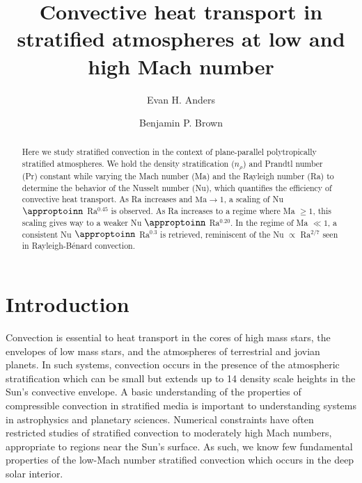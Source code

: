 \documentclass[aps, prl, twocolumn, groupedaddress, amsfonts, amssymb, amsmath]{revtex4-1}
\newcommand{\RB}{Rayleigh-B\'{e}nard }
\newcommand{\nrho}{\ensuremath{n_{\rho}}}
\newcommand{\approptoinn}[2]{\mathrel{\vcenter{
	\offinterlineskip\halign{\hfil$##$\cr
	#1\propto\cr\noalign{\kern2pt}#1\sim\cr\noalign{\kern-2pt}}}}}
\newcommand{\appropto}{\mathpalette\approptoinn\relax}
\begin{document}
\author{Evan H. Anders}
\author{Benjamin P. Brown}
\title{Convective heat transport in stratified atmospheres at low and high Mach number}

\begin{abstract}
Here we study stratified convection in the context of 
plane-parallel polytropically stratified atmospheres. 
We hold the density stratification (\nrho) and Prandtl number (Pr) constant while varying the
Mach number (Ma) and the Rayleigh number (Ra) to determine the behavior of the Nusselt number (Nu), 
which quantifies the efficiency of convective heat transport.
As Ra increases and $\text{Ma} \rightarrow 1$, a scaling of Nu $\appropto$ Ra$^{0.45}$ is observed.  
As Ra increases to a regime where Ma $\geq 1$,
this scaling gives way to a weaker Nu $\appropto$ Ra$^{0.20}$.  In the regime of Ma $\ll 1$, a consistent
Nu $\appropto$ Ra$^{0.3}$ is retrieved,  reminiscent of the Nu $\propto$ Ra$^{2/7}$ seen in \RB convection.
\end{abstract}
\maketitle


\section{Introduction}
\label{sec:intro}
Convection is essential to heat transport in the cores of high mass stars, the
envelopes of low mass stars, and the atmospheres of terrestrial and jovian planets. In such systems, convection
occurs in the presence of the atmospheric stratification which can be small but extends up to 
14 density scale heights in the Sun's convective envelope.
A basic understanding of the
properties of compressible convection in stratified media is important to understanding systems in astrophysics
and planetary sciences.  Numerical constraints have often restricted studies of stratified convection to
moderately high Mach numbers, appropriate to regions near the Sun's surface.  As such, we know few
fundamental properties of the low-Mach number stratified convection which occurs in the deep solar interior.
\end{document}
